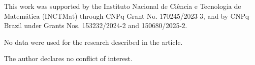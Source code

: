 \documentclass[reqno, 11pt, a4paper]{amsart}
\numberwithin{equation}{section}
\begin{document}


\vspace{1cm}



This work was supported by the Instituto Nacional de Ciência e Tecnologia de Matemática (INCTMat) through CNPq Grant No. 170245/2023-3, and by CNPq-Brazil under Grants Nos. 153232/2024-2 and 150680/2025-2.


 No data were used for the research described in the article.


 The author declares no conflict of interest.




 


%
 
 
 
    
    
\end{document}
